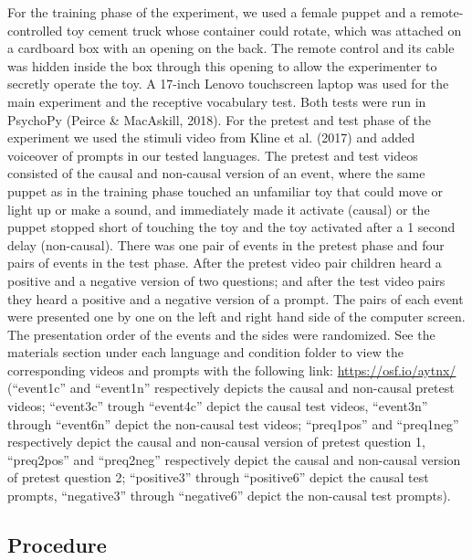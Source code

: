 \documentclass[man]{apa6}
\begin{document}
For the training phase of the experiment, we used a female puppet and a
remote-controlled toy cement truck whose container could rotate, which
was attached on a cardboard box with an opening on the back. The remote
control and its cable was hidden inside the box through this opening to
allow the experimenter to secretly operate the toy. A 17-inch Lenovo
touchscreen laptop was used for the main experiment and the receptive
vocabulary test. Both tests were run in PsychoPy (Peirce \& MacAskill,
2018). For the pretest and test phase of the experiment we used the
stimuli video from Kline et al. (2017) and added voiceover of prompts in
our tested languages. The pretest and test videos consisted of the
causal and non-causal version of an event, where the same puppet as in
the training phase touched an unfamiliar toy that could move or light up
or make a sound, and immediately made it activate (causal) or the puppet
stopped short of touching the toy and the toy activated after a 1 second
delay (non-causal). There was one pair of events in the pretest phase
and four pairs of events in the test phase. After the pretest video pair
children heard a positive and a negative version of two questions; and
after the test video pairs they heard a positive and a negative version
of a prompt. The pairs of each event were presented one by one on the
left and right hand side of the computer screen. The presentation order
of the events and the sides were randomized. See the materials section
under each language and condition folder to view the corresponding
videos and prompts with the following link: \url{https://osf.io/aytnx/}
(\enquote{event1c} and \enquote{event1n} respectively depicts the
causal and non-causal pretest videos; \enquote{event3c} trough
\enquote{event4c} depict the causal test videos, \enquote{event3n}
through \enquote{event6n} depict the non-causal test videos;
\enquote{preq1pos} and \enquote{preq1neg} respectively depict the causal
and non-causal version of pretest question 1, \enquote{preq2pos} and
\enquote{preq2neg} respectively depict the causal and non-causal version
of pretest question 2; \enquote{positive3} through \enquote{positive6}
depict the causal test prompts, \enquote{negative3} through
\enquote{negative6} depict the non-causal test prompts).

\subsection{Procedure}\label{procedure}
\end{document}
